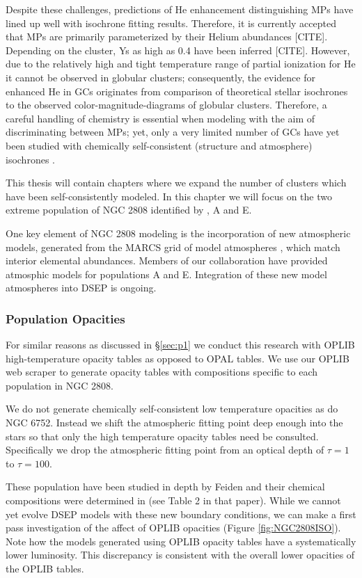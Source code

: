 Despite these challenges, predictions of He enhancement distinguishing MPs have
lined up well with isochrone fitting results. Therefore, it is currently
accepted that MPs are primarily parameterized by their Helium abundances
[CITE]. Depending on the cluster, Ys as high as 0.4 have been inferred [CITE].
However, due to the relatively high and tight temperature range of partial
ionization for He it cannot be observed in globular clusters; consequently, the
evidence for enhanced He in GCs originates from comparison of theoretical
stellar isochrones to the observed color-magnitude-diagrams of globular
clusters. Therefore, a careful handling of chemistry is essential when modeling
with the aim of discriminating between MPs; yet, only a very limited number of
GCs have yet been studied with chemically self-consistent (structure and
atmosphere) isochrones \citep[e.g.][NGC 6752]{Dotter2015}.

This thesis will contain chapters where we expand the number of clusters which
have been self-consistently modeled. In this chapter we will focus on the two
extreme population of NGC 2808 identified by \citep{Milone2015}, A and E.

One key element of NGC 2808 modeling is the incorporation of new atmospheric
models, generated from the MARCS grid of model atmospheres \citep{Plez2008},
which match interior elemental abundances. Members of our collaboration have
provided atmosphic models for populations A and E. Integration of these new
model atmospheres into DSEP is ongoing.

\subsubsection{Population Opacities}
For similar reasons as discussed in \S\ref{sec:p1} we conduct this research
with OPLIB high-temperature opacity tables as opposed to OPAL tables. We use
our OPLIB web scraper to generate opacity tables with compositions specific to
each population in NGC 2808.

We do not generate chemically self-consistent low temperature opacities as
\citep{Dotter2015} do NGC 6752. Instead we shift the atmospheric fitting
point deep enough into the stars so that only the high temperature opacity
tables need be consulted. Specifically we drop the atmospheric fitting point from
an optical depth of $\tau = 1$ to $\tau = 100$. 

These population have been studied in depth by Feiden and their chemical
compositions were determined in \citet{Milone2015} (see Table 2 in that paper).
While we cannot yet evolve DSEP models with these new boundary conditions, we
can make a first pass investigation of the affect of OPLIB opacities (Figure
\ref{fig:NGC2808ISO}). Note how the models generated using OPLIB opacity tables
have a systematically lower luminosity. This discrepancy is consistent with
the overall lower opacities of the OPLIB tables. 

